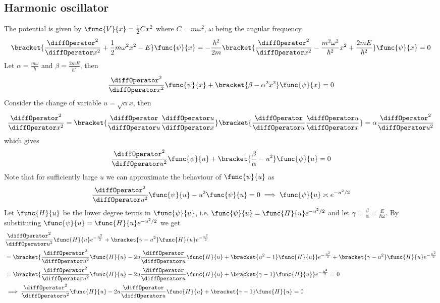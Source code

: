 \subsection{Harmonic oscillator}
The potential is given by \(\func{V}{x} = \frac{1}{2}Cx^2\) where \(C = m \omega^2\), \(\omega\) being the angular frequency.
\begin{equation*}
    \bracket{ \dfrac{\diffOperator^2}{\diffOperator x^2}  + \frac{1}{2}m\omega^2 x^2 - E} \func{\psi}{x} = -\frac{\hbar^2}{2m} \bracket{ \dfrac{\diffOperator^2}{\diffOperator x^2}  - \frac{m^2 \omega^2}{\hbar^2} x^2 + \dfrac{2mE}{\hbar^2}} \func{\psi}{x} = 0
\end{equation*}
Let \(\alpha = \frac{m \omega}{\hbar}\) and \(\beta = \frac{2mE}{\hbar^2}\), then
\begin{equation*}
    \frac{\diffOperator^2}{\diffOperator x^2} \func{\psi}{x} + \bracket{\beta - \alpha^2 x^2}\func{\psi}{x} = 0
\end{equation*}
Consider the change of variable \(u = \sqrt{\alpha}x\), then
\begin{equation*}
    \frac{\diffOperator^2}{\diffOperator x^2} =\bracket{\dfrac{\diffOperator}{\diffOperator u} \dfrac{\diffOperator u}{\diffOperator x}} \bracket{\dfrac{\diffOperator}{\diffOperator u} \dfrac{\diffOperator u}{\diffOperator x}} = \alpha \dfrac{\diffOperator^2}{\diffOperator u^2}
\end{equation*}
which gives
\begin{equation*}
    \frac{\diffOperator^2}{\diffOperator u^2} \func{\psi}{u} + \bracket{\frac{\beta}{\alpha} - u^2}\func{\psi}{u} = 0
\end{equation*}
Note that for sufficiently large \(u\) we can approximate the behaviour of \(\func{\psi}{u}\) as
\begin{equation*}
    \frac{\diffOperator^2}{\diffOperator u^2} \func{\psi}{u} -  u^2\func{\psi}{u} = 0 \implies \func{\psi}{u} \asymp  e^{-u^2/2}
\end{equation*}
Let \(\func{H}{u}\) be the lower degree terms in \(\func{\psi}{u}\), i.e. \(\func{\psi}{u} = \func{H}{u} e^{-u^2/2} \) and let \(\gamma = \frac{\beta}{\alpha} = \frac{E}{\hbar \omega}\). By substituting \(\func{\psi}{u} = \func{H}{u}e^{-u^2/2}\) we get
\begin{align*}
     & \frac{\diffOperator^2}{\diffOperator u^2}\func{H}{u} e^{-\frac{u^2}{2}} +  \bracket{\gamma - u^2} \func{H}{u} e^{-\frac{u^2}{2}}                                                                                                  \\
     & = \bracket{\frac{\diffOperator^2}{\diffOperator u^2}\func{H}{u} - 2u \frac{\diffOperator}{\diffOperator u}\func{H}{u} + \bracket{u^2 - 1} \func{H}{u}}  e^{-\frac{u^2}{2}} + \bracket{\gamma - u^2}\func{H}{u} e^{-\frac{u^2}{2}} \\
     & = \bracket{\frac{\diffOperator^2}{\diffOperator u^2}\func{H}{u} - 2u \frac{\diffOperator}{\diffOperator u}\func{H}{u} + \bracket{\gamma - 1}\func{H}{u} } e^{-\frac{u^2}{2}} = 0                                                  \\
     & \implies  \frac{\diffOperator^2}{\diffOperator u^2}\func{H}{u} - 2u \frac{\diffOperator}{\diffOperator u}\func{H}{u} + \bracket{\gamma - 1}\func{H}{u} = 0
\end{align*}
